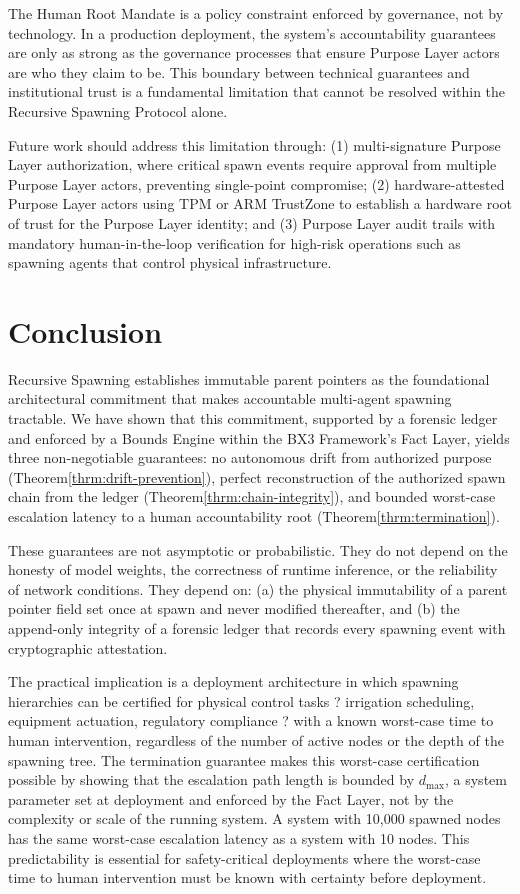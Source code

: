 The Human Root Mandate is a policy constraint enforced by governance, not by technology. In a production deployment, the system's accountability guarantees are only as strong as the governance processes that ensure Purpose Layer actors are who they claim to be. This boundary between technical guarantees and institutional trust is a fundamental limitation that cannot be resolved within the Recursive Spawning Protocol alone.

Future work should address this limitation through: (1) multi-signature Purpose Layer authorization, where critical spawn events require approval from multiple Purpose Layer actors, preventing single-point compromise; (2) hardware-attested Purpose Layer actors using TPM or ARM TrustZone to establish a hardware root of trust for the Purpose Layer identity; and (3) Purpose Layer audit trails with mandatory human-in-the-loop verification for high-risk operations such as spawning agents that control physical infrastructure.

\section{Conclusion}
\label{sec:conclusion}

Recursive Spawning establishes immutable parent pointers as the foundational architectural commitment that makes accountable multi-agent spawning tractable. We have shown that this commitment, supported by a forensic ledger and enforced by a Bounds Engine within the BX3 Framework's Fact Layer, yields three non-negotiable guarantees: no autonomous drift from authorized purpose (Theorem\;\ref{thrm:drift-prevention}), perfect reconstruction of the authorized spawn chain from the ledger (Theorem\;\ref{thrm:chain-integrity}), and bounded worst-case escalation latency to a human accountability root (Theorem\;\ref{thrm:termination}).

These guarantees are not asymptotic or probabilistic. They do not depend on the honesty of model weights, the correctness of runtime inference, or the reliability of network conditions. They depend on: (a) the physical immutability of a parent pointer field set once at spawn and never modified thereafter, and (b) the append-only integrity of a forensic ledger that records every spawning event with cryptographic attestation.

The practical implication is a deployment architecture in which spawning hierarchies can be certified for physical control tasks ? irrigation scheduling, equipment actuation, regulatory compliance ? with a known worst-case time to human intervention, regardless of the number of active nodes or the depth of the spawning tree. The termination guarantee makes this worst-case certification possible by showing that the escalation path length is bounded by $d_{\max}$, a system parameter set at deployment and enforced by the Fact Layer, not by the complexity or scale of the running system. A system with 10,000 spawned nodes has the same worst-case escalation latency as a system with 10 nodes. This predictability is essential for safety-critical deployments where the worst-case time to human intervention must be known with certainty before deployment.

